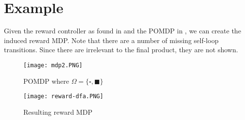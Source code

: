 \section*{Example}
Given the reward controller as found in  and the POMDP in , we can create the induced reward MDP. Note that there are a number of missing self-loop transitions. Since there are irrelevant to the final product, they are not shown.

\begin{figure}[H]
	\centering
	\texttt{[image: mdp2.PNG]}
	\label{fig:mdp2}
	\caption{POMDP where $\Omega=\{\square,\blacksquare\}$}
\end{figure}

\begin{figure}[H]
	\centering
	\texttt{[image: reward-dfa.PNG]}
	\caption{Resulting reward MDP}
\end{figure}

